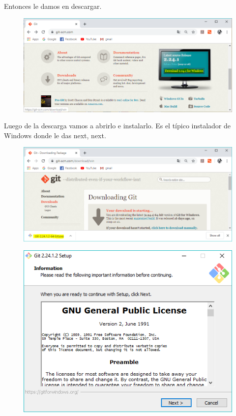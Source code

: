 \documentclass{article}
\begin{document}
Entonces le damos en descargar.

\begin{figure}[h!]
  \centering
  \includegraphics[scale=0.5]{./Pictures/012_gitbash.png}
\end{figure}

Luego de la descarga vamos a abrirlo e instalarlo. Es el típico instalador de
Windows donde le das next, next.

\begin{figure}[h!]
  \centering
  \includegraphics[scale=0.5]{./Pictures/013_gitbash.png}
\end{figure}

\newpage

\begin{figure}[h!]
  \centering
  \includegraphics[scale=0.65]{./Pictures/014_install_git.png}
\end{figure}
\end{document}
